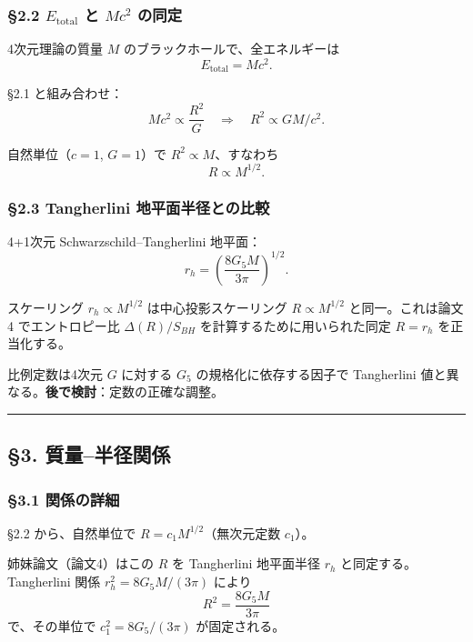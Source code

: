 \documentclass[a4paper,11pt]{ltjsarticle}
\theoremstyle{definition}
\begin{document}
\subsubsection{\texorpdfstring{§2.2 \(E_{\mathrm{total}}\) と \(M c^2\)
の同定}{§2.2 E\_\{\textbackslash mathrm\{total\}\} と M c\^{}2 の同定}}\label{e_mathrmtotal-ux3068-m-c2-ux306eux540cux5b9a}

4次元理論の質量 \(M\) のブラックホールで、全エネルギーは
\[E_{\mathrm{total}} = M c^2.\]

§2.1 と組み合わせ：
\[M c^2 \propto \frac{R^2}{G} \quad \Longrightarrow \quad R^2 \propto G M / c^2.\]

自然単位（\(c = 1\), \(G = 1\)）で \(R^2 \propto M\)、すなわち
\[\boxed{\;R \propto M^{1/2}.\;}\]

\subsubsection{§2.3 Tangherlini
地平面半径との比較}\label{tangherlini-ux5730ux5e73ux9762ux534aux5f84ux3068ux306eux6bd4ux8f03}

4+1次元 Schwarzschild--Tangherlini 地平面：
\[r_h = \left(\frac{8 G_5 M}{3\pi}\right)^{1/2}.\]

スケーリング \(r_h \propto M^{1/2}\) は中心投影スケーリング
\(R \propto M^{1/2}\) と同一。これは論文4 でエントロピー比
\(\Delta(R)/S_{BH}\) を計算するために用いられた同定 \(R = r_h\)
を正当化する。

比例定数は4次元 \(G\) に対する \(G_5\) の規格化に依存する因子で
Tangherlini 値と異なる。\textbf{後で検討}：定数の正確な調整。

\begin{center}\rule{0.5\linewidth}{0.5pt}\end{center}

\subsection{§3.
質量--半径関係}\label{ux8ceaux91cfux534aux5f84ux95a2ux4fc2}

\subsubsection{§3.1 関係の詳細}\label{ux95a2ux4fc2ux306eux8a73ux7d30}

§2.2 から、自然単位で \(R = c_1 M^{1/2}\)（無次元定数 \(c_1\)）。

姉妹論文（論文4）はこの \(R\) を Tangherlini 地平面半径 \(r_h\)
と同定する。Tangherlini 関係 \(r_h^2 = 8 G_5 M/(3\pi)\) により
\[R^2 = \frac{8 G_5 M}{3\pi}\] で、その単位で \(c_1^2 = 8 G_5/(3\pi)\)
が固定される。
\end{document}
